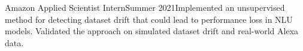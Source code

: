   {Amazon Applied Scientist Intern}{Summer 2021}{Implemented an unsupervised method for detecting dataset drift that could lead to performance loss in NLU models. Validated the approach on simulated dataset drift and real-world Alexa data.}{}